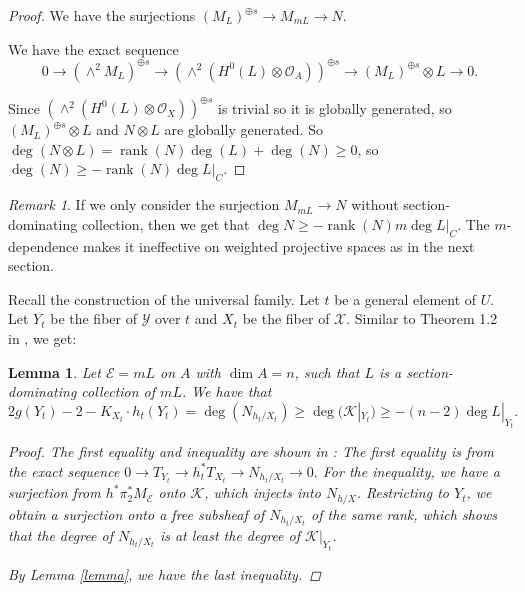 \documentclass{amsart}
\newtheorem{lemma}[theorem]{Lemma}
\theoremstyle{definition}
\theoremstyle{remark}
\newtheorem{remark}[theorem]{Remark}
\begin{document}
\begin{proof}
We have the surjections $(M_L)^{\oplus s} \to M_{mL}\to N$.

We have the exact sequence 
\[
0 \longrightarrow (\wedge^2 M_L)^{\oplus s} 
\longrightarrow (\wedge^2 (H^0(L) \otimes \mathcal{O}_A))^{\oplus s} 
\longrightarrow (M_L)^{\oplus s} \otimes L 
\longrightarrow 0.
\] 

Since $(\wedge^2 (H^0(L) \otimes \mathcal{O}_X))^{\oplus s}$ is trivial so it is globally generated, so 
$(M_L)^{\oplus s} \otimes L$ and $N \otimes L$ are globally generated. So $\deg(N\otimes L) = \operatorname{rank}(N)\deg(L)+\deg (N) \geq 0$, so $\deg(N)\geq- \operatorname{rank}(N) \deg L|_C$.
\end{proof}
\begin{remark} If we only consider the surjection $M_{mL}\to N$ without section-dominating collection, then we get that $\deg N \geq -\operatorname{rank}(N)m \deg L|_C$. The 
$m$-dependence makes it ineffective on weighted projective spaces as in the next section.
\end{remark}

Recall the construction of the universal family. Let $t$ be a general element of $U$. Let $Y_t$ be the fiber of $\mathcal Y$ over $t$ and $X_t$ be the fiber of $\mathcal X$. Similar to Theorem 1.2 in \cite{coskun2019algebraichyperbolicitygeneralsurfaces}, we get:
\begin{lemma}\label{lem}
Let $\mathcal E = mL$ on $A$ with $\operatorname{dim}A = n$, such that $L$ is a section-dominating collection of $mL$. 
We have that \[2g(Y_t)- 2 - K_{X_t} \cdot h_t(Y_t) =\deg(N_{h_t/X_t}) \geq \deg(\mathcal{K}|_{Y_t})\geq -(n-2)\deg L|_{Y_t}
.\]

\begin{proof}
The first equality and inequality are shown in \cite[Lemma 2.2]{coskun2019algebraichyperbolicitygeneralsurfaces}: The first equality is from the exact sequence
$
0 \to T_{Y_t} \to h_t^* T_{X_t} \to N_{h_t/X_t} \to 0.
$ For the inequality, we have a surjection from $h^*\pi_2^*M_{\mathcal E}$ onto $\mathcal{K}$, which injects into $N_{h/X}$. Restricting to $Y_t$, we obtain a surjection onto a free subsheaf of $N_{h_t/X_t}$ of the same rank, which shows that the degree of $N_{h_t/X_t}$ is at least the degree of $\mathcal{K}|_{Y_t}$.

By Lemma \ref{lemma}, we have the last inequality.
\end{proof}
\end{lemma}
\end{document}
